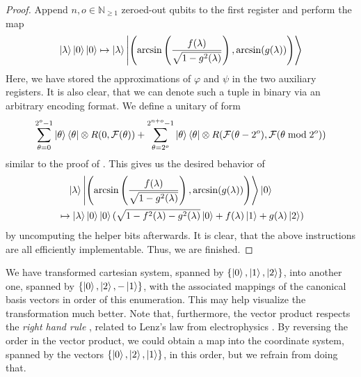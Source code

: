 \begin{proof}
    Append \(n, o \in \mathbb{N}_{\geq 1}\) zeroed-out qubits to the first register and perform the map
    \begin{align}
        \ket{\lambda}\ket{0}\ket{0} \mapsto \ket{\lambda}\ket{\left(\arcsin\left(\frac{f(\lambda)}{\sqrt{1-g^2(\lambda)}}\right), \arcsin(g(\lambda))\right)}
    \end{align}
    Here, we have stored the approximations of \(\varphi\) and \(\psi\) in the two auxiliary registers. It is also clear, that we can denote such a tuple in binary via an arbitrary encoding format. We define a unitary of form
    \begin{align}
        \sum_{\theta = 0}^{2^o-1} \ket{\theta}\bra{\theta} \otimes R(0, \mathcal{F}(\theta)) + \sum_{\theta = 2^o}^{2^{n+o}-1} \ket{\theta}\bra{\theta} \otimes R(\mathcal{F}(\theta - 2^o), \mathcal{F}(\theta \bmod 2^o))
    \end{align}
    similar to the proof of . This gives us the desired behavior of
    \begin{align}
        &\phantom{\mapsto} \ket{\lambda}\ket{\left(\arcsin\left(\frac{f(\lambda)}{\sqrt{1-g^2(\lambda)}}\right), \arcsin(g(\lambda))\right)} \ket{0}\\
        &\mapsto \ket{\lambda}\ket{0}\ket{0}(\sqrt{1-f^2(\lambda)-g^2(\lambda)}\ket{0}+f(\lambda)\ket{1}+g(\lambda)\ket{2})
    \end{align}
    by uncomputing the helper bits afterwards. It is clear, that the above instructions are all efficiently implementable. Thus, we are finished.
\end{proof}

\begin{remark}
    We have transformed cartesian system, spanned by \(\{\ket{0}, \ket{1}, \ket{2}\}\), into another one, spanned by \(\{\ket{0}, \ket{2}, -\ket{1}\}\), with the associated mappings of the canonical basis vectors in order of this enumeration. This may help visualize the transformation much better. Note that, furthermore, the vector product respects the \emph{right hand rule} \cite[pp. 70-75]{Janich2010}, related to Lenz's law from electrophysics \cite[pp. 314-315]{Griffiths}. By reversing the order in the vector product, we could obtain a map into the coordinate system, spanned by the vectors \(\{\ket{0}, \ket{2}, \ket{1}\}\), in this order, but we refrain from doing that.
\end{remark}

